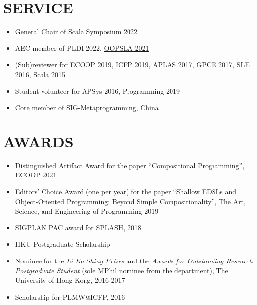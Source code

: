 \documentclass[paper=letter,fontsize=11pt]{scrartcl} %
\newcommand{\NewPart}[2]{\section*{\uppercase{#1} #2}}
\newcommand{\PaperEntry}[4]{
		\noindent #1, ``{#2}", In \textit{#3}, #4.} %
\newcommand{\ArxivEntry}[3]{
		\noindent #1, ``\href{http://arxiv.org/abs/#3}{#2}", \textit{{cond-mat/}#3}.}
\begin{document}
\NewPart{Service}{}
\begin{itemize}
\item General Chair of \href{https://2022.ecoop.org/home/scala-ecoop-2022}{Scala Symposium 2022}
\item AEC member of PLDI 2022, \href{https://2021.splashcon.org/committee/splash-2021-Artifacts-artifact-evaluation-committee}{OOPSLA 2021}
\item (Sub)reviewer for ECOOP 2019, ICFP 2019, APLAS 2017, GPCE 2017, SLE 2016, Scala 2015
\item Student volunteer for APSys 2016, Programming 2019
\item Core member of \href{https://gitee.com/HW-PLLab/community/tree/master/sigs/SIG-MetaProgramming}{SIG-Metaprogramming, China}
\end{itemize}





\NewPart{Awards}{}
\begin{itemize}
\item \href{https://2021.ecoop.org/attending/ecoop-awards#distinguished-artifact-awards}{Distinguished Artifact Award} for the paper ``Compositional Programming'', ECOOP 2021
\item \href{https://programming-journal.org/awards}{Editors' Choice Award} (one per year) for the paper ``Shallow EDSLs and Object-Oriented
  Programming: Beyond Simple Compositionality'', The Art, Science, and Engineering of Programming 2019
\item SIGPLAN PAC award for SPLASH, 2018
\item HKU Postgraduate Scholarship
\item Nominee for the \emph{Li Ka Shing Prizes} and the \emph{Awards for Outstanding Research
  Postgraduate Student} (sole MPhil nominee from the department), The University of Hong Kong, 2016-2017
\item Scholarship for PLMW@ICFP, 2016
\end{itemize}
\end{document}
